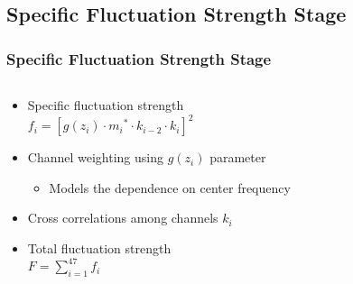 \documentclass{beamer}
\begin{document}
\subsection{Specific Fluctuation Strength Stage}
\begin{frame}
  \frametitle{Specific Fluctuation Strength Stage}
  \begin{columns}
    \begin{column}{0.5\textwidth}
      \begin{itemize}
        \item<1-> Specific fluctuation strength \\
          $f_i = [g(z_i) \cdot {m_i}^* \cdot k_{i-2} \cdot k_i]^2$
        \item<2-> Channel weighting using $g(z_i)$ parameter
        \begin{itemize}
          \item<3-> Models the dependence on center frequency
        \end{itemize}
        \item<4-> Cross correlations among channels $k_i$
        \item<5-> Total fluctuation strength \\
          $F = \displaystyle\sum_{i=1}^{47} f_i$
      \end{itemize}
    \end{column}
    \begin{column}{0.5\textwidth}
\end{column}
\end{columns}
\end{frame}
\end{document}
